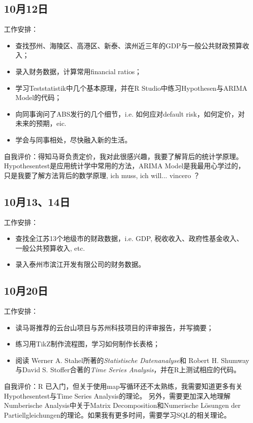 \documentclass[H:\workspace\实习日志\ShixiRizhi.tex]{subfiles}
\begin{document}
\subsection{10月12日}
工作安排：
\begin{itemize}
    \item 查找邳州、海陵区、高港区、新泰、滨州近三年的GDP与一般公共财政预算收入；
    \item 录入财务数据，计算常用financial ratios；
    \item 学习Teststatistik中几个基本原理，并在R Studio中练习Hypothesen与ARIMA Model的代码；
    \item 向同事询问了ABS发行的几个细节，i.e. 如何应对default risk，如何定价，对未来的预期，eic.
    \item 学会与同事相处，尽快融入新的生活。
\end{itemize}
自我评价：得知马哥负责定价，我对此很感兴趣，我要了解背后的统计学原理。Hypothesentest是应用统计学中常用的方法，ARIMA Model是我最用心学过的，只是我要了解方法背后的数学原理, ich muss, ich will... vincero ？

\subsection{10月13、14日}
工作安排：
\begin{itemize}
    \item 查找全江苏13个地级市的财政数据，i.e. GDP, 税收收入、政府性基金收入、一般公共预算收入, etc.
    \item 录入泰州市滨江开发有限公司的财务数据。
\end{itemize}

\subsection{10月20日}
工作安排：
\begin{itemize}
    \item 读马哥推荐的云台山项目与苏州科技项目的评审报告，并写摘要；
    \item 练习用TikZ制作流程图，学习如何制作长表格；
    \item 阅读 Werner A. Stahel所著的\textit{Statistische Datenanalyse}和 
    Robert H. Shumway与David S. Stoffer合著的\textit{Time Series Analysis}，并在R上测试相应的代码。
\end{itemize}
自我评价：R 已入门，但关于使用map写循环还不太熟练，我需要知道更多有关Hypothesentest与Time Series Analysis的理论。
另外，需要更加深入地理解Numberische Analysis中关于Matrix Decomposition和Numerische Lösungen der Partiellgleichungen的理论。如果我有更多时间，需要学习SQL的相关理论。
\end{document}

